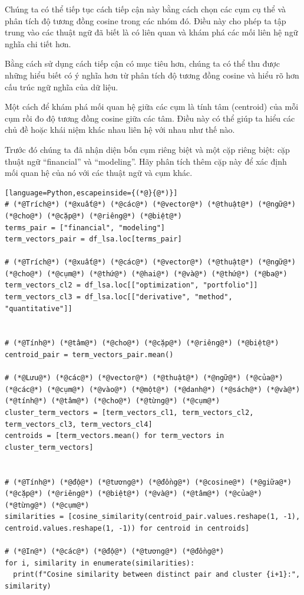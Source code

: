 Chúng ta có thể tiếp tục cách tiếp cận này bằng cách chọn các cụm cụ thể và phân tích độ tương đồng cosine trong các nhóm đó. Điều này cho phép ta tập trung vào các thuật ngữ đã biết là có liên quan và khám phá các mối liên hệ ngữ nghĩa chi tiết hơn.

Bằng cách sử dụng cách tiếp cận có mục tiêu hơn, chúng ta có thể thu được những hiểu biết có ý nghĩa hơn từ phân tích độ tương đồng cosine và hiểu rõ hơn cấu trúc ngữ nghĩa của dữ liệu.

Một cách để khám phá mối quan hệ giữa các cụm là tính tâm (centroid) của mỗi cụm rồi đo độ tương đồng cosine giữa các tâm. Điều này có thể giúp ta hiểu các chủ đề hoặc khái niệm khác nhau liên hệ với nhau như thế nào.

Trước đó chúng ta đã nhận diện bốn cụm riêng biệt và một cặp riêng biệt: cặp thuật ngữ ``financial'' và ``modeling''. Hãy phân tích thêm cặp này để xác định mối quan hệ của nó với các thuật ngữ và cụm khác.

\begin{lstlisting}[language=Python,escapeinside={(*@}{@*)}]
# (*@Trích@*) (*@xuất@*) (*@các@*) (*@vector@*) (*@thuật@*) (*@ngữ@*) (*@cho@*) (*@cặp@*) (*@riêng@*) (*@biệt@*)
terms_pair = ["financial", "modeling"]
term_vectors_pair = df_lsa.loc[terms_pair]

# (*@Trích@*) (*@xuất@*) (*@các@*) (*@vector@*) (*@thuật@*) (*@ngữ@*) (*@cho@*) (*@cụm@*) (*@thứ@*) (*@hai@*) (*@và@*) (*@thứ@*) (*@ba@*)
term_vectors_cl2 = df_lsa.loc[["optimization", "portfolio"]]
term_vectors_cl3 = df_lsa.loc[["derivative", "method", "quantitative"]]


# (*@Tính@*) (*@tâm@*) (*@cho@*) (*@cặp@*) (*@riêng@*) (*@biệt@*)
centroid_pair = term_vectors_pair.mean()

# (*@Lưu@*) (*@các@*) (*@vector@*) (*@thuật@*) (*@ngữ@*) (*@của@*) (*@các@*) (*@cụm@*) (*@vào@*) (*@một@*) (*@danh@*) (*@sách@*) (*@và@*) (*@tính@*) (*@tâm@*) (*@cho@*) (*@từng@*) (*@cụm@*)
cluster_term_vectors = [term_vectors_cl1, term_vectors_cl2, term_vectors_cl3, term_vectors_cl4]
centroids = [term_vectors.mean() for term_vectors in cluster_term_vectors]


# (*@Tính@*) (*@độ@*) (*@tương@*) (*@đồng@*) (*@cosine@*) (*@giữa@*) (*@cặp@*) (*@riêng@*) (*@biệt@*) (*@và@*) (*@tâm@*) (*@của@*) (*@từng@*) (*@cụm@*)
similarities = [cosine_similarity(centroid_pair.values.reshape(1, -1), centroid.values.reshape(1, -1)) for centroid in centroids]

# (*@In@*) (*@các@*) (*@độ@*) (*@tương@*) (*@đồng@*)
for i, similarity in enumerate(similarities):
  print(f"Cosine similarity between distinct pair and cluster {i+1}:", similarity)
\end{lstlisting}

